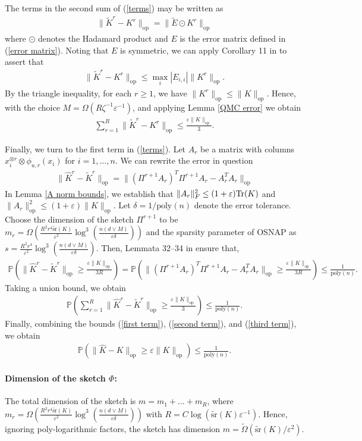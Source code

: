 \documentclass{article}
\theoremstyle{plain}
\theoremstyle{definition}
\theoremstyle{remark}
\newcommand{\numeq}[1]{\begin{align}#1\end{align}}
\newcommand{\eq}[1]{\begin{align*}#1\end{align*}}
\newcommand{\Tr}{\textnormal{Tr}}
\renewcommand{\Pr}{\mathbb{P}}
\begin{document}
The terms in the second sum of (\ref{terms}) may be written as
\eq{
\| \tilde K^r-K^r \|_\text{op} = \| \tilde E\odot K^r \|_\text{op}
}
where $\odot$ denotes the Hadamard product and $E$ is the error matrix defined in (\ref{error matrix}). Noting that $E$ is symmetric, we can apply Corollary 11 in \cite{ando1987singular} %
to assert that
\eq{
\| \tilde K^r-K^r \|_\text{op} \leq \max_i |E_{i,i}| \|K^r\|_\text{op}.
}
By the triangle inequality, for each $r\ge 1$, we have $\|K^r\|_\text{op}\leq \|K\|_\text{op}$. Hence, with the choice $M=\Omega(R \zeta^{-1}\varepsilon^{-1})$, and applying Lemma \ref{QMC error} we obtain
\numeq{ \label{second term}
\sum_{r=1}^R \| \tilde K^r-K^r \|_\text{op} \leq \frac{\varepsilon\|K\|_\text{op}}{3}.
}

Finally, we turn to the first term in (\ref{terms}). Let $A_r$ be a matrix with columns $x_i^{\otimes r} \otimes \phi_{u,r}(x_i)$ for $i=1,\dots,n$. We can rewrite the error in question
\eq{
\|\widehat K^r - \tilde K^r \|_\text{op} = \| (\Pi^{r+1} A_r )^T\Pi^{r+1} A_r -A_r^TA_r\|_\text{op}
}
In Lemma \ref{A norm bounds}, we establish that $\|A_r\|_F^2\leq (1+\varepsilon)\Tr(K)$ and $\|A_r\|^2_\text{op}\leq (1+\varepsilon)\|K\|_\text{op}$. Let $\delta = 1/\text{poly}(n)$ denote the error tolerance. Choose the dimension of the sketch $\Pi^{r+1}$ to be $m_r = \Omega\left(\frac{R^2 r^4 \tilde{\text{sr}}(K)}{\varepsilon^2}\log^3\left(\frac{n(d\vee M)}{\varepsilon \delta}\right)\right)$ and the sparsity parameter of \textsc{OSNAP} as $s=\frac{R^2 r^4}{\varepsilon^2}\log^3\left(\frac{n(d\vee M)}{\varepsilon \delta}\right)$. Then, Lemmata 32--34 in \cite{ahle2020oblivious} ensure that, 
\eq{
\Pr\left(\|\widehat K^r - \tilde K^r \|_\text{op} \geq \frac{\varepsilon\|K\|_\text{op}}{3R} \right) = \Pr\left(\| (\Pi^{r+1} A_r )^T\Pi^{r+1} A_r -A_r^TA_r\|_\text{op} \geq \frac{\varepsilon\|K\|_\text{op}}{3R} \right) \le \frac{1}{\text{poly}(n)}.
}
Taking a union bound, we obtain 
\numeq{ \label{first term}
\Pr\left(\sum_{r=1}^R\|\widehat K^r - \tilde K^r \|_\text{op} \ge \frac{\varepsilon\|K\|_\text{op}}{3} \right) \le \frac{1}{\text{poly}(n)}.
}
Finally, combining the bounds (\ref{first term}), (\ref{second term}), and (\ref{third term}), we obtain 
\eq{
\Pr\left (\|\widehat K - K\|_\text{op}  \ge \varepsilon\|K\|_\text{op}\right) \le \frac{1}{\text{poly}(n)}.
}

\paragraph{Dimension of the sketch $\Phi$:} The total dimension of the sketch is $m=m_1+\dots+m_R$, where $m_r =  \Omega\left(\frac{R^2 r^4 \tilde{\text{sr}}(K)}{\varepsilon^2}\log^3\left(\frac{n(d\vee M)}{\varepsilon \delta}\right)\right)$ with $R = C \log(\tilde{\text{sr}}(K) \varepsilon^{-1})$. Hence, ignoring poly-logarithmic factors, the sketch has dimension $m = \tilde \Omega(\tilde{\text{sr}}(K)/\varepsilon^2)$.
\end{document}
